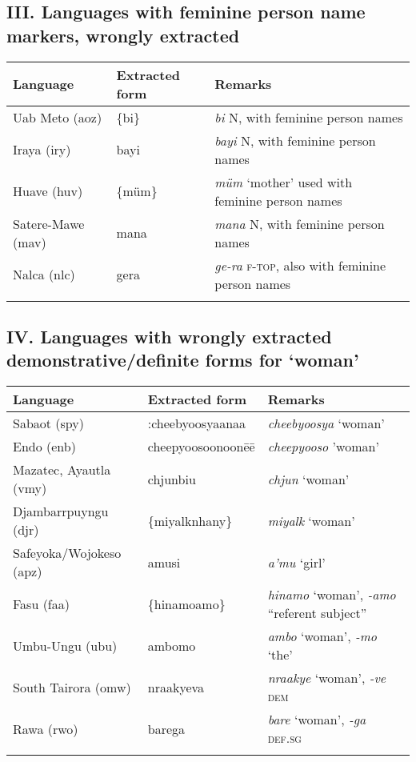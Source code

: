 \subsection*{III. Languages with feminine person name markers, wrongly extracted \normalfont [6 languages]}

\begin{tabularx}{\textwidth}{llQ}
\lsptoprule
 Language &  Extracted form &  Remarks \\
\midrule
Uab Meto (aoz)	&	\{bi\}	&	\textit{bi} N, with feminine person names	\\
Iraya (iry)	&	bayi	&	\textit{bayi} N, with feminine person names	\\
Huave (huv)	&	\{müm\}	&	\textit{müm} ‘mother’ used with feminine person names 	\\
Satere-Mawe (mav)	&	mana	&	\textit{mana} N, with feminine person names	\\
Nalca (nlc)	&	gera	&	\textit{ge-ra} \textsc{f-top}, also with feminine person names	\\
\lspbottomrule
\end{tabularx}



\subsection*{IV. Languages with wrongly extracted demonstrative/definite forms for ‘woman’
\normalfont [9 languages]}

\begin{tabularx}{\textwidth}{llQ}
\lsptoprule
 Language &  Extracted form &  Remarks \\
\midrule
Sabaot (spy)	&	:cheebyoosyaanaa	&	\textit{cheebyoosya} ‘woman’	\\
Endo (enb)	&	cheepyoosoonoonēē	&	\textit{cheepyooso} ’woman’	\\
Mazatec, Ayautla (vmy)	&	chjunbiu	&	\textit{chjun} ‘woman’	\\
Djambarrpuyngu (djr)	&	\{miyalknhany\}	&	\textit{miyalk} ‘woman’	\\
Safeyoka/Wojokeso (apz)	&	a\textquotesingle{}musi	&	\textit{a'mu} ‘girl’	\\
Fasu (faa)	&	\{hinamoamo\}	&	\textit{hinamo} ‘woman’, \textit{-amo} “referent subject”	\\
Umbu-Ungu (ubu)	&	ambomo	&	\textit{ambo} ‘woman’, \textit{-mo} ‘the’	\\
South Tairora (omw)	&	nraakyeva	&	\textit{nraakye} ‘woman’, \textit{-ve} \textsc{dem}	\\
Rawa (rwo)	&	barega	&	\textit{bare} ‘woman’, \textit{-ga} \textsc{def.sg}	\\
\lspbottomrule
\end{tabularx}


